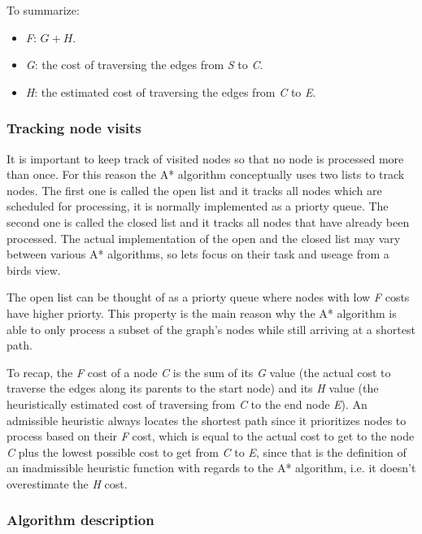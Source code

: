 \documentclass[12pt, a4paper]{article}
\begin{document}
To summarize:
\begin{itemize}
	\item \textit{F}: $ G + H $.
	\item \textit{G}: the cost of traversing the edges from \textit{S} to
	\textit{C}.
	\item \textit{H}: the estimated cost of traversing the edges from \textit{C}
	to \textit{E}.
\end{itemize}


\subsubsection{Tracking node visits}
\label{Tracking node visits}

It is important to keep track of visited nodes so that no node is processed more
than once. For this reason the A* algorithm conceptually uses two lists to track
nodes. The first one is called the open list and it tracks all nodes which are
scheduled for processing, it is normally implemented as a priorty queue. The
second one is called the closed list and it tracks all nodes that have already
been processed. The actual implementation of the open and the closed list may
vary between various A* algorithms, so lets focus on their task and useage from
a birds view.

The open list can be thought of as a priorty queue where nodes with low
\textit{F} costs have higher priorty. This property is the main reason why the
A* algorithm is able to only process a subset of the graph's nodes while still
arriving at a shortest path.

To recap, the \textit{F} cost of a node \textit{C} is the sum of its \textit{G}
value (the actual cost to traverse the edges along its parents to the start
node) and its \textit{H} value (the heuristically estimated cost of traversing
from \textit{C} to the end node \textit{E}). An admissible heuristic always
locates the shortest path since it prioritizes nodes to process based on their
\textit{F} cost, which is equal to the actual cost to get to the node \textit{C}
plus the lowest possible cost to get from \textit{C} to \textit{E}, since that
is the definition of an inadmissible heuristic function with regards to the A*
algorithm, i.e. it doesn't overestimate the \textit{H} cost.

\subsubsection{Algorithm description}
\end{document}

